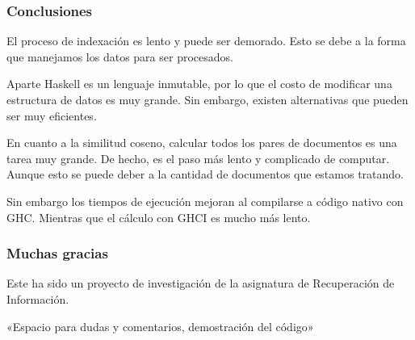 \documentclass[aspectratio=169]{beamer}
\begin{document}
\begin{frame}
\frametitle{Conclusiones}
El proceso de indexación es lento y puede ser demorado. \pause
Esto se debe a la forma que manejamos los datos para ser procesados.\pause

Aparte Haskell es un lenguaje inmutable, por lo que el costo de
modificar una estructura de datos es muy grande. \pause
Sin embargo, existen alternativas que pueden ser muy eficientes. \pause

En cuanto a la similitud coseno, calcular todos los pares de documentos
es una tarea muy grande. \pause De hecho, es el paso más lento y
complicado de computar. \pause Aunque esto se puede deber a la
cantidad de documentos que estamos tratando. \pause

Sin embargo los tiempos de ejecución mejoran al compilarse a código
nativo con GHC. \pause Mientras que el cálculo con GHCI es mucho más
lento.
\end{frame}

\begin{frame}
\frametitle{Muchas gracias}
Este ha sido un proyecto de investigación de la asignatura de
Recuperación de Información.

«Espacio para dudas y comentarios, demostración del código»
\end{frame}
\end{document}
